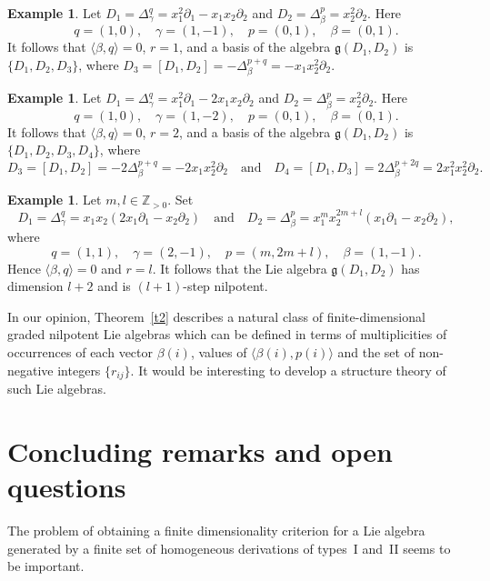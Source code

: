 \documentclass[a4paper, 12pt,oneside,reqno]{amsart}
\numberwithin{equation}{section}
\theoremstyle{definition}
\newtheorem{example}[theorem]{Example}
\begin{document}
{\begin{example}
Let $D_1=\Delta^q_{\gamma}=x_1^2\partial_1-x_1x_2\partial_2$ and $D_2=\Delta^p_{\beta}=x_2^2\partial_2$. Here 
$$
q=(1,0),\quad \gamma=(1,-1),\quad p=(0,1),\quad \beta=(0,1).
$$ 
It follows that $\langle\beta, q\rangle=0$, $r=1$, and a basis of the algebra $\mathfrak{g}(D_1,D_2)$ is $\{D_1,D_2,D_3\}$, where $D_3=[D_1,D_2]=-\Delta^{p+q}_{\beta}=-x_1x_2^2\partial_2$. 
\end{example}

\begin{example}
Let $D_1=\Delta^q_{\gamma}=x_1^2\partial_1-2x_1x_2\partial_2$ and $D_2=\Delta^p_{\beta}=x_2^2\partial_2$. Here 
$$
q=(1,0),\quad \gamma=(1,-2),\quad p=(0,1),\quad \beta=(0,1).
$$ 
It follows that $\langle\beta, q\rangle=0$, $r=2$, and a basis of the algebra $\mathfrak{g}(D_1,D_2)$ is $\{D_1,D_2,D_3,D_4\}$, where 
$$
D_3=[D_1,D_2]=-2\Delta^{p+q}_{\beta}=-2x_1x_2^2\partial_2 \quad \text{and} \quad
D_4=[D_1,D_3]=2\Delta^{p+2q}_{\beta}=2x_1^2x_2^2\partial_2.
$$
\end{example}

\begin{example}
Let $m,l \in \mathbb{Z}_{>0}$. Set
$$
D_1=\Delta^q_{\gamma}=x_1x_2(2x_1\partial_1-x_2\partial_2)\quad \text{and}\quad D_2=\Delta^p_{\beta}=x_1^mx_2^{2m+l}(x_1\partial_1-x_2\partial_2),
$$ 
where 
$$
q=(1,1),\quad \gamma=(2,-1),\quad p=(m,2m+l),\quad \beta=(1,-1).
$$ 
Hence $\langle\beta, q\rangle=0$ and $r=l$. It follows that the Lie algebra $\mathfrak{g}(D_1,D_2)$ has dimension $l+2$ and is $(l+1)$-step nilpotent.  
\end{example}

In our opinion, Theorem~\ref{t2} describes a natural class of finite-dimensional graded nilpotent Lie algebras which can be defined in terms of multiplicities of occurrences of each vector $\beta(i)$, values of $\langle\beta(i),p(i)\rangle$ and the set of non-negative integers $\{r_{ij}\}$. It would be interesting to develop a structure theory of such Lie algebras.


\section{Concluding remarks and open questions}\label{s4}

The problem of obtaining a finite dimensionality criterion for a Lie algebra generated by a finite set of homogeneous derivations of types~I and~II seems to be important. 

}
\end{document}

